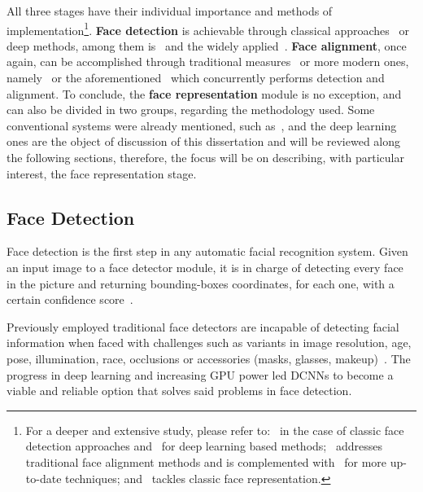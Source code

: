 \documentclass[class=report, crop=false, a4paper, 12pt]{standalone}
\begin{document}
\par All three stages have their individual importance and methods of implementation\footnote{For a deeper and extensive study, please refer to:~\autocite{zafeiriouSurveyFaceDetection2015} in the case of classic face detection approaches and~\autocite{minaeeGoingDeeperFace2021} for deep learning based methods;~\autocite{wangFacialFeaturePoint2018} addresses traditional face alignment methods and is complemented with~\autocite{duElementsEndtoendDeep2022} for more up-to-date techniques; and~\autocite{learned-millerLabeledFacesWild2016} tackles classic face representation.}. \textbf{Face detection} is achievable through classical approaches~\autocite{violaRapidObjectDetection2001, brubakerDesignCascadesBoosted2008} or deep methods, among them is~\autocite{dengRetinaFaceSinglestageDense2019} and the widely applied~\autocite{zhangJointFaceDetection2016a}. \textbf{Face alignment}, once again, can be accomplished through traditional measures~\autocite{cootesViewbasedActiveAppearance2002, martinezLocalEvidenceAggregation2013} or more modern ones, namely~\autocite{huangPropagationNetPropagatePoints2020} or the aforementioned~\autocite{zhangJointFaceDetection2016a} which concurrently performs detection and alignment. To conclude, the \textbf{face representation} module is no exception, and can also be divided in two groups, regarding the methodology used. Some conventional systems were already mentioned, such as~\autocite{p.n.belhumeurEigenfacesVsFisherfaces1997,turkEigenfacesRecognition1991}, and the deep learning ones are the object of discussion of this dissertation and will be reviewed along the following sections, therefore, the focus will be on describing, with particular interest, the face representation stage.

\subsection{Face Detection}
\par Face detection is the first step in any automatic facial recognition system. Given an input image to a face detector module, it is in charge of detecting every face in the picture and returning bounding-boxes coordinates, for each one, with a certain confidence score~\autocite{duElementsEndtoendDeep2022,ranjanDeepLearningUnderstanding2018}.

\par Previously employed traditional face detectors are incapable of detecting facial information when faced with challenges such as variants in image resolution, age, pose, illumination, race, occlusions or accessories (masks, glasses, makeup)~\autocite{duElementsEndtoendDeep2022,ranjanDeepLearningUnderstanding2018}. The progress in deep learning and increasing GPU power led DCNNs to become a viable and reliable option that solves said problems in face detection. 
\end{document}
